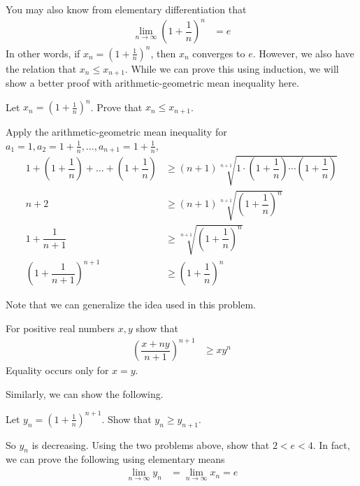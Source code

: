 \documentclass{subfile}
\begin{document}
	You may also know from elementary differentiation that
		\begin{align*}
			\lim\limits_{n\to\infty}\left(1+\dfrac{1}{n}\right)^n
				& = e
		\end{align*}
	In other words, if $x_n=\left(1+\frac{1}{n}\right)^n$, then $x_n$ converges to $e$. However, we also have the relation that $x_n\leq x_{n+1}$. While we can prove this using induction, we will show a better proof with arithmetic-geometric mean inequality here.
		\begin{problem}
			Let $x_n=\left(1+\frac{1}{n}\right)^n$. Prove that $x_n\leq x_{n+1}$.
				\begin{solution}
					Apply the arithmetic-geometric mean inequality for $a_1=1,a_2=1+\frac{1}{n},\ldots,a_{n+1}=1+\frac{1}{n}$,
						\begin{align*}
							1+\left(1+\dfrac{1}{n}\right)+\ldots+\left(1+\dfrac{1}{n}\right)
								& \geq(n+1)\sqrt[n+1]{1\cdot\left(1+\dfrac{1}{n}\right)\cdots\left(1+\dfrac{1}{n}\right)}\\
							n+2
								& \geq(n+1)\sqrt[n+1]{\left(1+\dfrac{1}{n}\right)^n}\\
							1+\dfrac{1}{n+1}
								& \geq\sqrt[n+1]{\left(1+\dfrac{1}{n}\right)^n}\\
							\left(1+\dfrac{1}{n+1}\right)^{n+1}
								& \geq\left(1+\dfrac{1}{n}\right)^n
						\end{align*}
				\end{solution}
		\end{problem}
	Note that we can generalize the idea used in this problem.
		\begin{problem}
			For positive real numbers $x,y$ show that
				\begin{align*}
					\left(\dfrac{x+ny}{n+1}\right)^{n+1}
						& \geq xy^n
				\end{align*}
			Equality occurs only for $x=y$.
		\end{problem}
	Similarly, we can show the following.
		\begin{problem}
			Let $y_n=\left(1+\frac{1}{n}\right)^{n+1}$. Show that $y_n\geq y_{n+1}$.
		\end{problem}
	So $y_n$ is decreasing. Using the two problems above, show that $2<e<4$. In fact, we can prove the following using elementary means
		\begin{align*}
			\lim\limits_{n\to\infty}y_{n}
				& = \lim\limits_{n\to\infty}x_{n}=e
		\end{align*}
	
\end{document}
